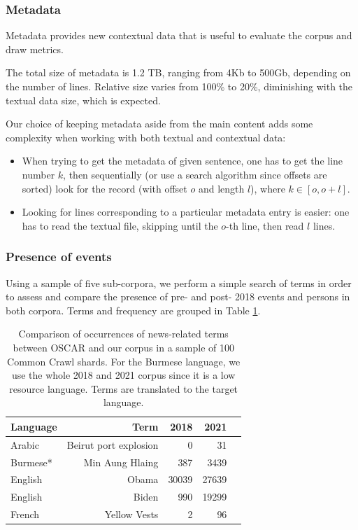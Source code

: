 \subsubsection{Metadata}

Metadata provides new contextual data that is useful to evaluate the corpus and draw metrics.

The total size of metadata is 1.2 TB, ranging from 4Kb to 500Gb, depending on the number of lines. Relative size varies from 100\% to 20\%, diminishing with the textual data size, which is expected.

Our choice of keeping metadata aside from the main content adds some complexity when working with both textual and contextual data:

\begin{itemize}
    \item When trying to get the metadata of given sentence, one has to get the line number $k$, then sequentially (or use a search algorithm since offsets are sorted) look for the record (with offset $o$ and length $l$), where $k \in [o, o+l]$.
    \item Looking for lines corresponding to a particular metadata entry is easier: one has to read the textual file, skipping until the $o$-th line, then read $l$ lines.
\end{itemize}


\subsubsection{Presence of events}

Using a sample of five sub-corpora, we perform a simple search of terms in order to assess and compare the presence of pre- and post- 2018 events and persons in both corpora. Terms and frequency are grouped in Table \ref{tab:word-frequency}.

\begin{table}[t]
    \centering\small
    \begin{tabular}{lrrrr}
        \toprule
        Language                  & Term                  & 2018  & 2021  \\
        \midrule
        \multirow{1}{*}{Arabic}   & Beirut port explosion & 0     & 31    \\
        \multirow{1}{*}{Burmese*} & Min Aung Hlaing       & 387   & 3439  \\
        \multirow{1}{*}{English}  & Obama                 & 30039 & 27639 \\
        \multirow{1}{*}{English}  & Biden                 & 990   & 19299 \\
        \multirow{1}{*}{French}   & Yellow Vests          & 2     & 96    \\
        \bottomrule
    \end{tabular}
    \caption{Comparison of occurrences of news-related terms between OSCAR and our corpus in a sample of 100 Common Crawl shards. For the Burmese language, we use the whole 2018 and 2021 corpus since it is a low resource language. Terms are translated to the target language.}
    \label{tab:word-frequency}
\end{table}

